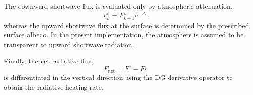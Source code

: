 The downward shortwave flux is evaluated only by atmospheric attenuation,
\begin{equation}
F^{\downarrow}_{k} = F^{\downarrow}_{k+1} e^{-\Delta\tau},
\end{equation}
whereas the upward shortwave flux at the surface is determined by the prescribed surface albedo.
In the present implementation, the atmosphere is assumed to be
transparent to upward shortwave radiation.


Finally, the net radiative flux,
\begin{equation}
F_{\mathrm{net}} = F^{\uparrow} - F^{\downarrow},
\end{equation}
is differentiated in the vertical direction using the DG derivative operator to obtain the radiative heating rate.